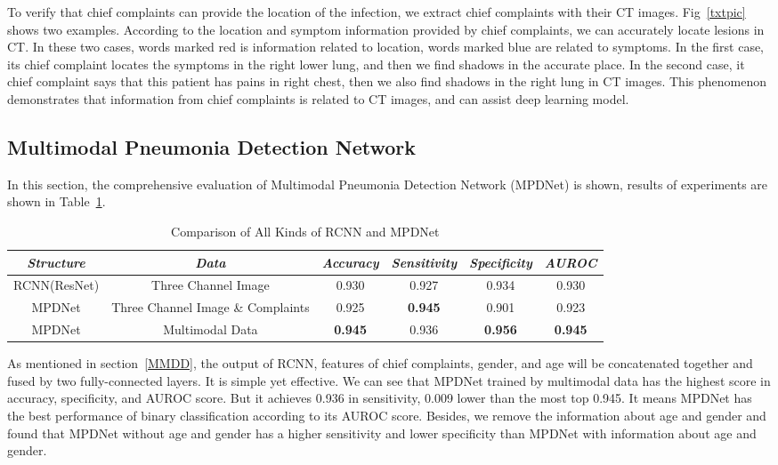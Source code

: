 \documentclass[journal]{IEEEtran}
\begin{document}
To verify that chief complaints can provide the location of the infection, we extract chief complaints with their CT images. Fig~\ref{txtpic} shows two examples. According to the location and symptom information provided by chief complaints, we can accurately locate lesions in CT. 
In these two cases, words marked red is information related to location, words marked blue are related to symptoms. In the first case, its chief complaint locates the symptoms in the right lower lung, and then we find shadows in the accurate place. In the second case, it chief complaint says that this patient has pains in right chest, then we also find shadows in the right lung in CT images.
This phenomenon demonstrates that information from chief complaints is related to CT images, and can assist deep learning model.

\subsection{Multimodal Pneumonia Detection Network}
\label{results}
In this section, the comprehensive evaluation of Multimodal Pneumonia Detection Network (MPDNet) is shown, results of experiments are shown in Table~\ref{mpdnetres}.
\begin{table}[htb]
    \caption{Comparison of All Kinds of RCNN and MPDNet}
    \begin{center}
    \begin{tabular}{|c|c|c|c|c|c|}

    \hline
    \textbf{\textit{Structure}} & \textbf{\textit{Data}}& \textbf{\textit{Accuracy}}  & \textbf{\textit{Sensitivity}} & \textbf{\textit{Specificity}} & \textbf{\textit{AUROC}}\\
    \hline
    RCNN(ResNet) & Three Channel Image&  0.930 & 0.927 &  0.934 &  0.930 \\
    MPDNet & Three Channel Image \& Complaints & 0.925 & {\bfseries 0.945} & 0.901 & 0.923 \\
    MPDNet & Multimodal Data&  {\bfseries 0.945} & 0.936 & {\bfseries 0.956} & {\bfseries 0.945} \\
    \hline

    \end{tabular}
    \vspace{-0cm}
    \label{mpdnetres}
    \end{center}
    \vspace{-0cm}
    \end{table}
As mentioned in section~\ref{MMDD}, the output of RCNN, features of chief complaints, gender, and age will be concatenated together and fused by two fully-connected layers. It is simple yet effective. We can see that MPDNet trained by multimodal data has the highest score in accuracy, specificity, and AUROC score. But it achieves 0.936 in sensitivity, 0.009 lower than the most top 0.945. It means MPDNet has the best performance of binary classification according to its AUROC score. 
Besides, we remove the information about age and gender and found that MPDNet without age and gender has a higher sensitivity and lower specificity than MPDNet with information about age and gender. 
    
\end{document}
